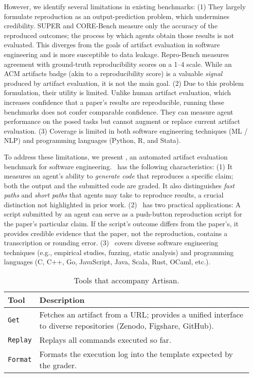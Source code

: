 However, we identify several limitations in existing benchmarks:
(1) They largely formulate reproduction as an output-prediction problem, which undermines credibility.
SUPER and CORE-Bench measure only the accuracy of the reproduced outcomes; the process by which agents obtain those results is not evaluated.
This diverges from the goals of artifact evaluation in software engineering and is more susceptible to data leakage.
Repro-Bench measures agreement with ground-truth reproducibility scores on a 1–4 scale.
While an ACM artifacts badge (akin to a reproducibility score) is a valuable \emph{signal} produced by artifact evaluation, it is not the main goal.
(2) Due to this problem formulation, their utility is limited.
Unlike human artifact evaluation, which increases confidence that a paper’s results are reproducible, running these benchmarks does not confer comparable confidence.
They can measure agent performance on the posed tasks but cannot augment or replace current artifact evaluation.
(3) Coverage is limited in both software engineering techniques (ML / NLP) and programming languages (Python, R, and Stata).

To address these limitations, we present \benchmark, an automated artifact evaluation benchmark for software engineering.
\benchmark~has the following characteristics:
(1) It measures an agent’s ability to \emph{generate code} that reproduces a specific claim; both the output and the submitted code are graded.
It also distinguishes \emph{fast paths} and \emph{short paths} that agents may take to reproduce results, a crucial distinction not highlighted in prior work.
(2) \benchmark~has two practical applications:
A script submitted by an agent can serve as a push-button reproduction script for the paper’s particular claim.
If the script’s outcome differs from the paper’s, it provides credible evidence that the paper, not the reproduction, contains a transcription or rounding error.
(3) \benchmark~covers diverse software engineering techniques (e.g., empirical studies, fuzzing, static analysis) and programming languages (C, C++, Go, JavaScript, Java, Scala, Rust, OCaml, etc.).

\begin{table}[t]
\caption{Tools that accompany Artisan.}
\label{t:artisan_tools}
\centering
\renewcommand{\arraystretch}{1.25}
\begin{tabularx}{\linewidth}{lX}
\toprule
\textbf{Tool} & \textbf{Description} \\
\midrule
\texttt{Get} & Fetches an artifact from a URL; provides a unified interface to diverse repositories (Zenodo, Figshare, GitHub). \\
\texttt{Replay} & Replays all commands executed so far. \\
\texttt{Format} & Formats the execution log into the template expected by the grader. \\
\bottomrule
\end{tabularx}
\end{table}


